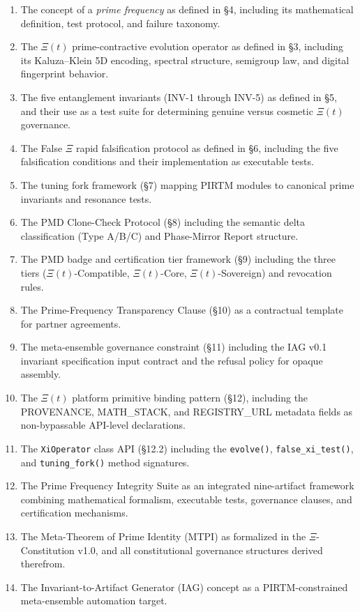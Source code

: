 \documentclass[12pt,letterpaper]{article}
\theoremstyle{definition}
\theoremstyle{remark}
\begin{document}
\begin{enumerate}
\item The concept of a \emph{prime frequency} as defined in \S4, including its mathematical definition, test protocol, and failure taxonomy.

\item The $\Xi(t)$ prime-contractive evolution operator as defined in \S3, including its Kaluza--Klein 5D encoding, spectral structure, semigroup law, and digital fingerprint behavior.

\item The five entanglement invariants (INV-1 through INV-5) as defined in \S5, and their use as a test suite for determining genuine versus cosmetic $\Xi(t)$ governance.

\item The False $\Xi$ rapid falsification protocol as defined in \S6, including the five falsification conditions and their implementation as executable tests.

\item The tuning fork framework (\S7) mapping PIRTM modules to canonical prime invariants and resonance tests.

\item The PMD Clone-Check Protocol (\S8) including the semantic delta classification (Type A/B/C) and Phase-Mirror Report structure.

\item The PMD badge and certification tier framework (\S9) including the three tiers ($\Xi(t)$-Compatible, $\Xi(t)$-Core, $\Xi(t)$-Sovereign) and revocation rules.

\item The Prime-Frequency Transparency Clause (\S10) as a contractual template for partner agreements.

\item The meta-ensemble governance constraint (\S11) including the IAG v0.1 invariant specification input contract and the refusal policy for opaque assembly.

\item The $\Xi(t)$ platform primitive binding pattern (\S12), including the PROVENANCE, MATH\_STACK, and REGISTRY\_URL metadata fields as non-bypassable API-level declarations.

\item The \texttt{XiOperator} class API (\S12.2) including the \texttt{evolve()}, \texttt{false\_xi\_test()}, and \texttt{tuning\_fork()} method signatures.

\item The Prime Frequency Integrity Suite as an integrated nine-artifact framework combining mathematical formalism, executable tests, governance clauses, and certification mechanisms.

\item The Meta-Theorem of Prime Identity (MTPI) as formalized in the $\Xi$-Constitution v1.0, and all constitutional governance structures derived therefrom.

\item The Invariant-to-Artifact Generator (IAG) concept as a PIRTM-constrained meta-ensemble automation target.
\end{enumerate}
\end{document}

